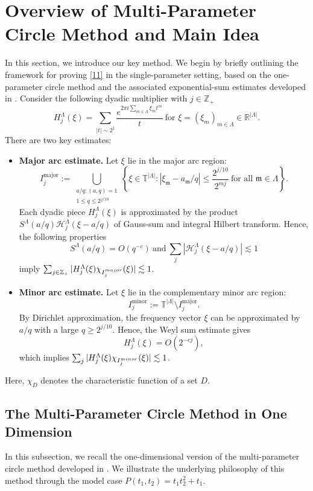 \documentclass[10pt,a4paper]{amsart}
\numberwithin{equation}{section}
\begin{document}
\section{Overview of Multi-Parameter Circle Method and Main Idea}\label{sec34}In this section, we introduce our key method.
We begin by briefly outlining the framework for proving \eqref{11} in the single-parameter setting, based on the one-parameter circle method and the associated exponential-sum estimates developed in \cite{AO,B1,B2,B3,HR,SW2,V}.
  Consider the following dyadic multiplier with $j\in\mathbb{Z}_{+}$
$$ H^{\Lambda}_j(\xi)=\sum_{|t|\sim 2^j} \frac{e^{2\pi i \sum_{m\in \Lambda}\xi_mt^m}}{t} \ \text{for $\xi=(\xi_m)_{m\in\Lambda}\in \mathbb{R}^{|\Lambda|}$}.$$  
There are two key estimates:
\begin{itemize}
	\item[(1)] \textbf{Major arc estimate.} Let $\xi$ lie  in the major arc region:
	\[
	I^{\mathrm{major}}_j
	:=
	\bigcup_{\substack{a/q : (a,q)=1 \\ 1\le q \le 2^{j/10}}}
	\left\{
	\xi \in \mathbb{T}^{|\Lambda|} :
	|\xi_{\mathfrak{m}} - a_{\mathfrak{m}}/q| \le \frac{2^{j/10}}{2^{mj}}
	\ \text{for all } \mathfrak{m} \in \Lambda
	\right\}.
	\]
	Each dyadic piece $H_j^{\Lambda}(\xi)$ is approximated by the product  $S^{\Lambda}(a/q)\mathcal{H}^{\Lambda}_j(\xi-a/q)$ 
	of  Gauss-sum  and  integral Hilbert transform. Hence, the following properties  $$S^{\Lambda}(a/q)=O(q^{-c})\ \text{and}\  \sum_j|\mathcal{H}^{\Lambda}_j(\xi-a/q) |\lesssim 1$$ imply $\sum_{j\in\mathbb{Z}_+} |H_j^{\Lambda}(\xi)\chi_{I_j^{\rm{major}}}(\xi) |\lesssim 1$.
	\item[(2)] \textbf{Minor arc estimate.}
	Let $\xi$ lie  in the complementary minor arc region:
	\[
	I^{\mathrm{minor}}_j := \mathbb{T}^{|\Lambda|} \setminus I^{\mathrm{major}}_j.
	\]
	By Dirichlet approximation, the frequency vector $\xi$ can be approximated by $a/q$ with a large $q\ge 2^{j/10}$. Hence, the Weyl sum estimate gives  $$H_j^{\Lambda}(\xi)=O(2^{-cj}),$$ which implies
	$\sum_{j} |H_j^{\Lambda}(\xi)\chi_{I_j^{\rm{minor}}}(\xi) |\lesssim 1$.
\end{itemize}
\bigskip
Here, $\chi_D$ denotes the characteristic function of a set $D$.
 \subsection{The Multi-Parameter Circle Method in One Dimension}In this subsection, we recall the one-dimensional version of the multi-parameter circle method developed in \cite{KS}. We illustrate the underlying philosophy of this method through the model case $P(t_1,t_2)=t_1t_2^{2}+t_1$. 
 
\end{document}
